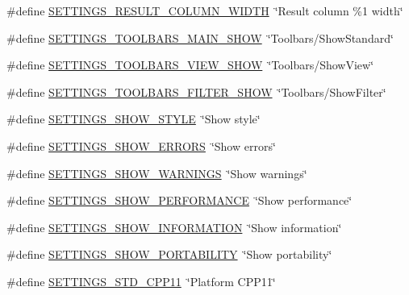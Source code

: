 \begin{DoxyCompactItemize}
\item 
\#define \hyperlink{group___g_u_i_ga861e8d67f8ba2e9bb225fbc42bd72711}{S\-E\-T\-T\-I\-N\-G\-S\-\_\-\-R\-E\-S\-U\-L\-T\-\_\-\-C\-O\-L\-U\-M\-N\-\_\-\-W\-I\-D\-T\-H}~\char`\"{}Result column \%1 width\char`\"{}
\item 
\#define \hyperlink{group___g_u_i_ga69bea28755f04fac84dbd830becb3dd5}{S\-E\-T\-T\-I\-N\-G\-S\-\_\-\-T\-O\-O\-L\-B\-A\-R\-S\-\_\-\-M\-A\-I\-N\-\_\-\-S\-H\-O\-W}~\char`\"{}Toolbars/Show\-Standard\char`\"{}
\item 
\#define \hyperlink{group___g_u_i_ga6679975d28ec0175f8655801fc3f1424}{S\-E\-T\-T\-I\-N\-G\-S\-\_\-\-T\-O\-O\-L\-B\-A\-R\-S\-\_\-\-V\-I\-E\-W\-\_\-\-S\-H\-O\-W}~\char`\"{}Toolbars/Show\-View\char`\"{}
\item 
\#define \hyperlink{group___g_u_i_ga223b32c991c408caa8fa5f36ec93c8b6}{S\-E\-T\-T\-I\-N\-G\-S\-\_\-\-T\-O\-O\-L\-B\-A\-R\-S\-\_\-\-F\-I\-L\-T\-E\-R\-\_\-\-S\-H\-O\-W}~\char`\"{}Toolbars/Show\-Filter\char`\"{}
\item 
\#define \hyperlink{group___g_u_i_gaa527faee8a6e8be7fd06ae4fb05c888d}{S\-E\-T\-T\-I\-N\-G\-S\-\_\-\-S\-H\-O\-W\-\_\-\-S\-T\-Y\-L\-E}~\char`\"{}Show style\char`\"{}
\item 
\#define \hyperlink{group___g_u_i_ga668301bfcaa103d985761867f8011018}{S\-E\-T\-T\-I\-N\-G\-S\-\_\-\-S\-H\-O\-W\-\_\-\-E\-R\-R\-O\-R\-S}~\char`\"{}Show errors\char`\"{}
\item 
\#define \hyperlink{group___g_u_i_gac146558e33b6141cd41ead13e897f09c}{S\-E\-T\-T\-I\-N\-G\-S\-\_\-\-S\-H\-O\-W\-\_\-\-W\-A\-R\-N\-I\-N\-G\-S}~\char`\"{}Show warnings\char`\"{}
\item 
\#define \hyperlink{group___g_u_i_ga76b50dbc8e110d8e0f4efcf94f6cacfe}{S\-E\-T\-T\-I\-N\-G\-S\-\_\-\-S\-H\-O\-W\-\_\-\-P\-E\-R\-F\-O\-R\-M\-A\-N\-C\-E}~\char`\"{}Show performance\char`\"{}
\item 
\#define \hyperlink{group___g_u_i_ga09730d719810e36a011ab3dedc207024}{S\-E\-T\-T\-I\-N\-G\-S\-\_\-\-S\-H\-O\-W\-\_\-\-I\-N\-F\-O\-R\-M\-A\-T\-I\-O\-N}~\char`\"{}Show information\char`\"{}
\item 
\#define \hyperlink{group___g_u_i_gae4ab41fb36b1b8edfb2dbcf578aeffbd}{S\-E\-T\-T\-I\-N\-G\-S\-\_\-\-S\-H\-O\-W\-\_\-\-P\-O\-R\-T\-A\-B\-I\-L\-I\-T\-Y}~\char`\"{}Show portability\char`\"{}
\item 
\#define \hyperlink{group___g_u_i_gaa5b7d926df243f5551cfd1fd8eb37a0e}{S\-E\-T\-T\-I\-N\-G\-S\-\_\-\-S\-T\-D\-\_\-\-C\-P\-P11}~\char`\"{}Platform C\-P\-P11\char`\"{}
\item 

\end{DoxyCompactItemize}
